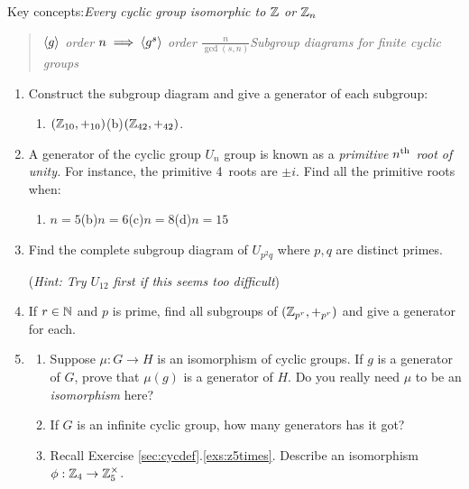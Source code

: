 \begin{exercises}
	Key concepts:\quad \emph{Every cyclic group isomorphic to $\mathbb{Z}$ or $\mathbb{Z}_n$}
	\begin{quote}
		\emph{$\left\langle g\right\rangle$ order $n\implies \left\langle g^s\right\rangle$ order $\frac n{\gcd(s,n)}$\qquad Subgroup diagrams for finite cyclic groups}
	\end{quote}
	
	
	\begin{enumerate}
		\item Construct the subgroup diagram and give a generator of each subgroup:
		\begin{enumerate}
		  \item $(\mathbb{Z}_{10},+_{10})$\qquad\qquad (b)\lstsp $(\mathbb{Z}_{42},+_{42})$.
		\end{enumerate}
	  
	  
	  \item A generator of the cyclic group $U_n$ group is known as a \emph{primitive $n\textsuperscript{th}$ root of unity.} For instance, the primitive 4\th\ roots are $\pm i$. Find all the primitive roots when:
	  \begin{enumerate}
	    \item $n=5$\hfill (b)\lstsp $n=6$\hfill (c)\lstsp $n=8$\hfill (d)\lstsp $n=15$\hspace*{\fill}\hspace*{\fill}
	  \end{enumerate}
		
		
		\item Find the complete subgroup diagram of $U_{p^2q}$ where $p,q$ are distinct primes.\par
		(\emph{Hint: Try $U_{12}$ first if this seems too difficult})
	  
	  
	  \item If $r\in\mathbb{N}$ and $p$ is prime, find all subgroups of $(\mathbb{Z}_{p^r},+_{p^r})$ and give a generator for each.
	  
	  		
	  \item\begin{enumerate}
	    \item Suppose $\mu:G\to H$ is an isomorphism of cyclic groups. If $g$ is a generator of $G$, prove that $\mu(g)$ is a generator of $H$. Do you really need $\mu$ to be an \emph{isomorphism} here?
	  
	  	\item If $G$ is an infinite cyclic group, how many generators has it got?
	  	
			\item Recall Exercise \ref*{sec:cycdef}.\ref{exs:z5times}. Describe an isomorphism $\phi:\mathbb{Z}_4\to\mathbb{Z}_5^\times$.
	  \end{enumerate} 
	  

\end{enumerate}
\end{exercises}
